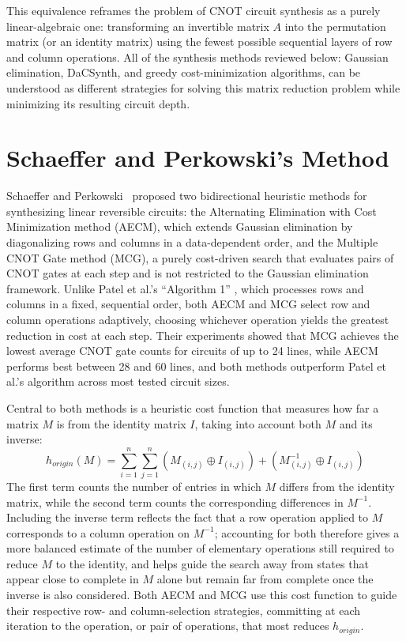 This equivalence reframes the problem of CNOT circuit synthesis as a purely linear-algebraic one: transforming an invertible matrix  $A$ into the permutation matrix (or an identity matrix) using the fewest possible sequential layers of row and column operations. All of the synthesis methods reviewed below: Gaussian elimination, DaCSynth, and greedy cost-minimization algorithms, can be understood as different strategies for solving this matrix reduction problem while minimizing its resulting circuit depth.

\section{Schaeffer and Perkowski's Method}
Schaeffer and Perkowski~\cite{schaeffer2014cost} proposed two bidirectional
heuristic methods for synthesizing linear reversible circuits: the
Alternating Elimination with Cost Minimization method (AECM), which extends
Gaussian elimination by diagonalizing rows and columns in a data-dependent
order, and the Multiple CNOT Gate method (MCG), a purely cost-driven search
that evaluates pairs of CNOT gates at each step and is not restricted to the
Gaussian elimination framework. Unlike Patel et al.'s ``Algorithm 1''
\cite{markov2008optimal}, which processes rows and columns in a fixed,
sequential order, both AECM and MCG select row and column operations
adaptively, choosing whichever operation yields the greatest reduction in
cost at each step. Their experiments showed that MCG achieves the lowest
average CNOT gate counts for circuits of up to 24 lines, while AECM performs
best between 28 and 60 lines, and both methods outperform Patel et al.'s
algorithm across most tested circuit sizes.

Central to both methods is a heuristic cost function that measures how far
a matrix $M$ is from the identity matrix $I$, taking into account both $M$
and its inverse:
\begin{equation}
	h_{origin}(M) = \sum_{i=1}^{n}\sum_{j=1}^{n}(M_{(i,j)} \oplus I_{(i,j)}) + (M^{-1}_{(i,j)} \oplus I_{(i,j)})
\end{equation}
The first term counts the number of entries in which $M$ differs from the
identity matrix, while the second term counts the corresponding differences
in $M^{-1}$. Including the inverse term reflects the fact that a row
operation applied to $M$ corresponds to a column operation on $M^{-1}$;
accounting for both therefore gives a more balanced estimate of the number
of elementary operations still required to reduce $M$ to the identity, and
helps guide the search away from states that appear close to complete in
$M$ alone but remain far from complete once the inverse is also considered.
Both AECM and MCG use this cost function to guide their respective row- and
column-selection strategies, committing at each iteration to the operation,
or pair of operations, that most reduces $h_{origin}$.

